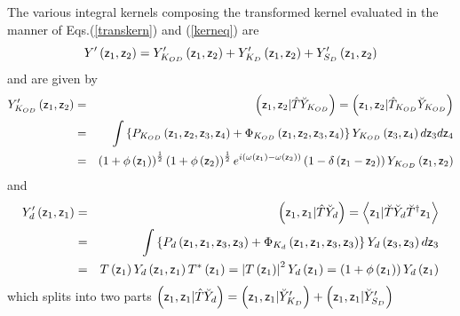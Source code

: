 The various integral kernels composing the transformed kernel evaluated in
the manner of Eqs.(\ref{transkern}) and (\ref{kerneq}) are 
\begin{equation}
Y^{\prime }\left( {\sf z}_{1},{\sf z}_{2}\right) =Y_{K_{OD}}^{\prime }\left( 
{\sf z}_{1},{\sf z}_{2}\right) +Y_{K_{D}}^{\prime }\left( {\sf z}_{1},{\sf z}%
_{2}\right) +Y_{S_{D}}^{\prime }\left( {\sf z}_{1},{\sf z}_{2}\right)
\end{equation}%
and are given by 
\begin{eqnarray}
Y_{K_{OD}}^{\prime }\left( {\sf z}_{1},{\sf z}_{2}\right) &=&\left( {\sf z}%
_{1},{\sf z}_{2}|\hat{T}\breve{Y}_{K_{OD}}\right) =\left( {\sf z}_{1},{\sf z}%
_{2}|\hat{T}_{K_{OD}}\breve{Y}_{K_{OD}}\right)  \nonumber \\
&=&\int \left\{ P_{K_{OD}}\left( {\sf z}_{1},{\sf z}_{2},{\sf z}_{3},{\sf z}%
_{4}\right) +\Phi _{K_{OD}}\left( {\sf z}_{1},{\sf z}_{2},{\sf z}_{3},{\sf z}%
_{4}\right) \right\} Y_{K_{OD}}\left( {\sf z}_{3},{\sf z}_{4}\right) d{\sf z}%
_{3}d{\sf z}_{4}  \nonumber \\
&=&\left( 1+\phi \left( {\sf z}_{1}\right) \right) ^{\frac{1}{2}}\left(
1+\phi \left( {\sf z}_{2}\right) \right) ^{\frac{1}{2}}e^{i\left( \omega
\left( {\sf z}_{1}\right) -\omega \left( {\sf z}_{2}\right) \right) }\left(
1-\delta \left( {\sf z}_{1}-{\sf z}_{2}\right) \right) Y_{K_{OD}}\left( {\sf %
z}_{1},{\sf z}_{2}\right)
\end{eqnarray}%
and 
\begin{eqnarray}
Y_{d}^{\prime }\left( {\sf z}_{1},{\sf z}_{1}\right) &=&\left( {\sf z}_{1},%
{\sf z}_{1}|\hat{T}\breve{Y}_{d}\right) =\left\langle {\sf z}_{1}|\breve{T}%
\breve{Y}_{d}\breve{T}^{\dagger }{\sf z}_{1}\right\rangle  \nonumber \\
&=&\int \left\{ P_{d}\left( {\sf z}_{1},{\sf z}_{1},{\sf z}_{3},{\sf z}%
_{3}\right) +\Phi _{K_{d}}\left( {\sf z}_{1},{\sf z}_{1},{\sf z}_{3},{\sf z}%
_{3}\right) \right\} Y_{d}\left( {\sf z}_{3},{\sf z}_{3}\right) d{\sf z}_{3}
\nonumber \\
&=&T\left( {\sf z}_{1}\right) Y_{d}\left( {\sf z}_{1},{\sf z}_{1}\right)
T^{\ast }\left( {\sf z}_{1}\right) =\left| T\left( {\sf z}_{1}\right)
\right| ^{2}Y_{d}\left( {\sf z}_{1}\right) =\left( 1+\phi \left( {\sf z}%
_{1}\right) \right) Y_{d}\left( {\sf z}_{1}\right)
\end{eqnarray}%
which splits into two parts $\left( {\sf z}_{1},{\sf z}_{1}|\hat{T}\breve{Y}%
_{d}\right) =\left( {\sf z}_{1},{\sf z}_{1}|\breve{Y}_{K_{D}}^{\prime
}\right) +\left( {\sf z}_{1},{\sf z}_{1}|\breve{Y}_{S_{D}}^{\prime }\right) $
